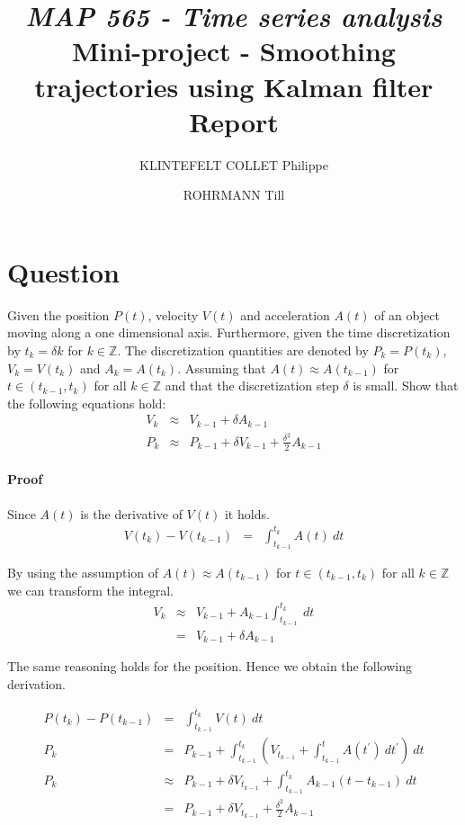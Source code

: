 \documentclass[a4paper, 12pt, titlepage]{article}
\title
{{\em MAP 565 - Time series analysis}\\
Mini-project - Smoothing trajectories using Kalman filter\\
{\bf Report}}
\author{KLINTEFELT COLLET Philippe \and ROHRMANN Till}
\date{}
\begin{document}
\maketitle

\section{Question}

Given the position $P(t)$, velocity $V(t)$ and acceleration $A(t)$ of an object moving along a one dimensional axis. 
Furthermore, given the time discretization by $t_k=\delta k$ for $k\in \mathbb{Z}$.
The discretization quantities are denoted by $P_k=P(t_k)$, $V_k=V(t_k)$ and $A_k=A(t_k)$.
Assuming that $A(t)\approx A(t_{k-1})$ for $t\in (t_{k-1},t_k)$ for all $k\in\mathbb{Z}$ and that the discretization step $\delta$ is small.
Show that the following equations hold:
\begin{eqnarray}
	V_k &\approx& V_{k-1} + \delta A_{k-1}\\
	P_k &\approx& P_{k-1} + \delta V_{k-1} + \frac{\delta^2}{2} A_{k-1}
\end{eqnarray}

\paragraph{Proof}

Since $A(t)$ is the derivative of $V(t)$ it holds.
\begin{eqnarray}
	V(t_k) - V(t_{k-1}) &=& \int_{t_{k-1}}^{t_k} A(t)\ dt
\end{eqnarray}

By using the assumption of $A(t)\approx A(t_{k-1})$ for $t\in (t_{k-1},t_k)$ for all $k\in\mathbb{Z}$ we can transform the integral.
\begin{eqnarray}
	V_k &\approx& V_{k-1} + A_{k-1} \int_{t_{k-1}}^{t_k}\ dt \\
	&=& V_{k-1}+\delta A_{k-1}
\end{eqnarray}

The same reasoning holds for the position. 
Hence we obtain the following derivation.

\begin{eqnarray}
	P(t_k) - P(t_{k-1}) &=& \int_{t_{k-1}}^{t_k} V(t)\ dt\\
	P_k &=& P_{k-1} + \int_{t_{k-1}}^{t_k}\left( V_{t_{k-1}} + \int_{t_{k-1}}^{t} A(t^{\prime})\ dt^{\prime}\right)\ dt\\
	P_k &\approx& P_{k-1} + \delta V_{t_{k-1}} + \int_{t_{k-1}}^{t_k} A_{k-1}(t-t_{k-1})\ dt\\
	&=& P_{k-1} + \delta V_{t_{k-1}} + \frac{\delta^2}{2} A_{k-1}	
\end{eqnarray}
\end{document}
